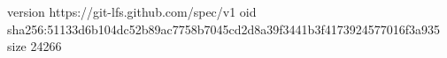 version https://git-lfs.github.com/spec/v1
oid sha256:51133d6b104dc52b89ac7758b7045cd2d8a39f3441b3f4173924577016f3a935
size 24266
